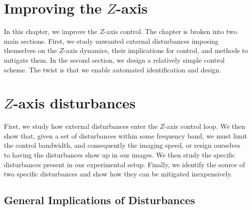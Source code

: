 \section{Improving the $Z$-axis}\label{chap:zaxis-improv}

In this chapter, we improve the $Z$-axis control. The chapter is broken into two main sections. First, we study unwanted external disturbances imposing themselves on the $Z$-axis dynamics, their implications for control, and methods to mitigate them. In the second section, we design a relatively simple control scheme. The twist is that we enable automated identification and design.

\section{$Z$-axis disturbances}\label{sec:zaxis-dist}
First, we study how external disturbances enter the $Z$-axis control loop. We then show that, given a set of disturbances within some frequency band, we must limit the control bandwidth, and consequently the imaging speed, or resign ourselves to having the disturbances show up in our images. We then study the specific disturbances present in our experimental setup. Finally, we identify the source of two specific disturbances and show how they can be mitigated inexpensively.

\subsection{General Implications of Disturbances}

